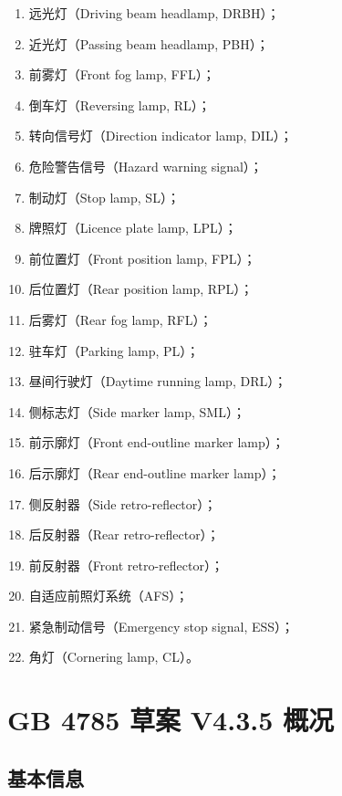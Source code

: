 \begin{enumerate}[leftmargin=2em]
    \item 远光灯（Driving beam headlamp, DRBH）；
    \item 近光灯（Passing beam headlamp, PBH）；
    \item 前雾灯（Front fog lamp, FFL）；
    \item 倒车灯（Reversing lamp, RL）；
    \item 转向信号灯（Direction indicator lamp, DIL）；
    \item 危险警告信号（Hazard warning signal）；
    \item 制动灯（Stop lamp, SL）；
    \item 牌照灯（Licence plate lamp, LPL）；
    \item 前位置灯（Front position lamp, FPL）；
    \item 后位置灯（Rear position lamp, RPL）；
    \item 后雾灯（Rear fog lamp, RFL）；
    \item 驻车灯（Parking lamp, PL）；
    \item 昼间行驶灯（Daytime running lamp, DRL）；
    \item 侧标志灯（Side marker lamp, SML）；
    \item 前示廓灯（Front end-outline marker lamp）；
    \item 后示廓灯（Rear end-outline marker lamp）；
    \item 侧反射器（Side retro-reflector）；
    \item 后反射器（Rear retro-reflector）；
    \item 前反射器（Front retro-reflector）；
    \item 自适应前照灯系统（AFS）；
    \item 紧急制动信号（Emergency stop signal, ESS）；
    \item 角灯（Cornering lamp, CL）。
\end{enumerate}

\section{GB 4785 草案 V4.3.5 概况}

\subsection{基本信息}

